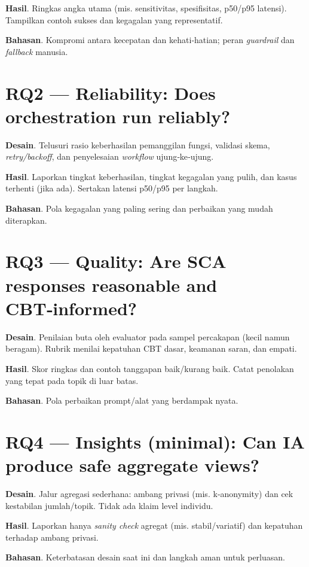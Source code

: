 \textbf{Hasil}. Ringkas angka utama (mis. sensitivitas, spesifisitas, p50/p95 latensi). Tampilkan contoh sukses dan kegagalan yang representatif.

\textbf{Bahasan}. Kompromi antara kecepatan dan kehati‑hatian; peran \textit{guardrail} dan \textit{fallback} manusia.

\section{RQ2 — Reliability: Does orchestration run reliably?}
\label{sec:rq2}

\textbf{Desain}. Telusuri rasio keberhasilan pemanggilan fungsi, validasi skema, \textit{retry/backoff}, dan penyelesaian \textit{workflow} ujung‑ke‑ujung.

\textbf{Hasil}. Laporkan tingkat keberhasilan, tingkat kegagalan yang pulih, dan kasus terhenti (jika ada). Sertakan latensi p50/p95 per langkah.

\textbf{Bahasan}. Pola kegagalan yang paling sering dan perbaikan yang mudah diterapkan.

\section{RQ3 — Quality: Are SCA responses reasonable and CBT‑informed?}
\label{sec:rq3}

\textbf{Desain}. Penilaian buta oleh evaluator pada sampel percakapan (kecil namun beragam). Rubrik menilai kepatuhan CBT dasar, keamanan saran, dan empati.

\textbf{Hasil}. Skor ringkas dan contoh tanggapan baik/kurang baik. Catat penolakan yang tepat pada topik di luar batas.

\textbf{Bahasan}. Pola perbaikan prompt/alat yang berdampak nyata.

\section{RQ4 — Insights (minimal): Can IA produce safe aggregate views?}
\label{sec:rq4}

\textbf{Desain}. Jalur agregasi sederhana: ambang privasi (mis. k‑anonymity) dan cek kestabilan jumlah/topik. Tidak ada klaim level individu.

\textbf{Hasil}. Laporkan hanya \textit{sanity check} agregat (mis. stabil/variatif) dan kepatuhan terhadap ambang privasi.

\textbf{Bahasan}. Keterbatasan desain saat ini dan langkah aman untuk perluasan.

